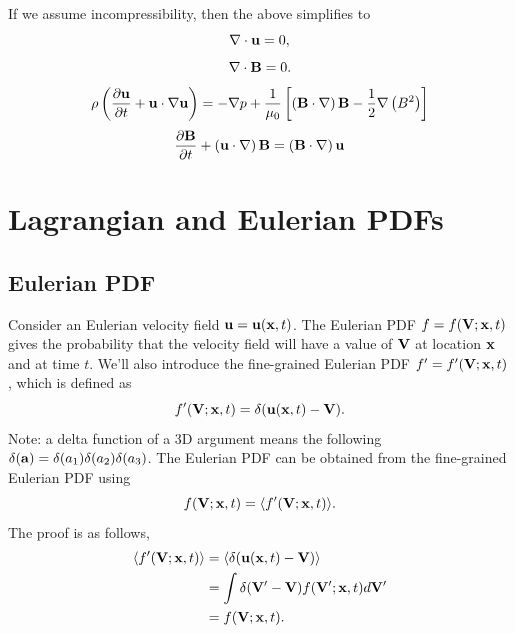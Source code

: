 \documentclass[a4paper,11pt]{report}
\begin{document}
If we assume incompressibility, then the above simplifies to
\begin{equation}
    \nabla \cdot \mathbf{u} = 0,
\end{equation}
\begin{equation}
    \nabla \cdot \mathbf{B} = 0.
    \end{equation}
\begin{equation}
    \rho \left (\frac{\partial \mathbf{u}}{\partial t} + \mathbf{u} \cdot \nabla \mathbf{u} \right ) = - \nabla p  + \frac{1}{\mu_0} \left [ \left ( \mathbf{B} \cdot \nabla \right ) \mathbf{B} - \frac{1}{2} \nabla \left ( B^2 \right ) \right ]
\end{equation}
\begin{equation}
    \frac{\partial \mathbf{B}}{\partial t} + \left ( \mathbf{u} \cdot \nabla \right ) \mathbf{B} = \left ( \mathbf{B} \cdot \nabla \right ) \mathbf{u}
\end{equation}

\appendix

\chapter{Lagrangian and Eulerian PDFs}

\section{Eulerian PDF}
Consider an Eulerian velocity field $\mathbf{u} = \mathbf{u}(\mathbf{x},t)$. The Eulerian PDF $f = f(\mathbf{V}; \mathbf{x},t)$ gives the probability that the velocity field will have a value of $\mathbf{V}$ at location $\mathbf{x}$ and at time $t$. We'll also introduce the fine-grained Eulerian PDF $f' = f'(\mathbf{V};\mathbf{x},t)$, which is defined as 
\begin{equation}
    f'(\mathbf{V}; \mathbf{x}, t) = \delta(\mathbf{u}(\mathbf{x},t) - \mathbf{V}).
\end{equation}
Note: a delta function of a 3D argument means the following $\delta(\mathbf{a}) = \delta(a_1) \delta(a_2) \delta(a_3) $. The Eulerian PDF can be obtained from the fine-grained Eulerian PDF using 
\begin{equation}
    \label{eq:fine_eul_pdf}
    f(\mathbf{V}; \mathbf{x}, t)=\langle f'(\mathbf{V}; \mathbf{x}, t) \rangle.
\end{equation}
The proof is as follows,
\begin{align}
    \langle f'(\mathbf{V}; \mathbf{x}, t) \rangle &= \langle \delta( \mathbf{u}(\mathbf{x},t) - \mathbf{V}) \rangle \nonumber \\
    &= \int \delta( \mathbf{V}' - \mathbf{V}) f(\mathbf{V}';\mathbf{x},t) d\mathbf{V}' \nonumber \\
    &= f(\mathbf{V}; \mathbf{x}, t).
\end{align}
\end{document}
